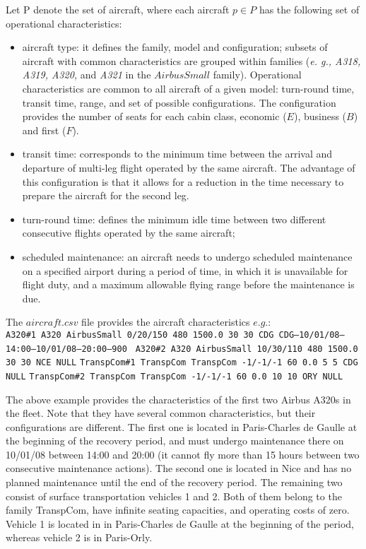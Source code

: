 \documentclass[ijoo,nonblindrev]{informs-ijoo}
\begin{document}
Let P denote the set of aircraft, where each aircraft $p \in  P$ has the following set of operational characteristics:\\
\begin{itemize}
	\item aircraft type: it defines the family, model and configuration; subsets of aircraft with common characteristics are grouped within families (\textit{e. g., A318, A319, A320,} and \textit{A321} in the \textit{$Airbus Small$} family). Operational characteristics are common to all aircraft of a given model: turn-round time, transit time, range, and set of possible configurations. The configuration provides the number of seats for each cabin class, economic ($E$), business ($B$) and first ($F$).
	
	\item transit time: corresponds to the minimum time between the arrival and departure of multi-leg flight operated by the same aircraft. The advantage of this configuration is that it allows for a reduction in the time necessary to prepare the aircraft for the second leg.
	
	\item turn-round time: defines the minimum idle time between two different consecutive flights operated by the same aircraft;
	\item scheduled maintenance: an aircraft needs to undergo scheduled maintenance on a specified airport during a period of time, in which it is unavailable for flight duty, and a maximum allowable flying range before the maintenance is due. 
\end{itemize}

The $aircraft.csv$ file provides the aircraft characteristics $e.g.$:\\
\newline
{\texttt{\footnotesize A320\#1 A320 AirbusSmall 0/20/150 480 1500.0 30 30 CDG CDG–10/01/08–14:00–10/01/08–20:00–900 }}
{\texttt{\footnotesize A320\#2 A320 AirbusSmall 10/30/110 480 1500.0 30 30 NCE NULL}}
\newline
{\texttt{\footnotesize TranspCom\#1 TranspCom TranspCom -1/-1/-1 60 0.0 5 5 CDG NULL}}
\newline
{\texttt{\footnotesize TranspCom\#2 TranspCom TranspCom -1/-1/-1 60 0.0 10 10 ORY NULL}}
\newline

The above example provides the characteristics of the first two Airbus A320s in the fleet. Note that they have several common characteristics, but their configurations are different. The first one is located in Paris-Charles de Gaulle at the beginning of the recovery period, and must undergo maintenance there on 10/01/08 between 14:00 and 20:00 (it cannot fly more than 15 hours between two consecutive maintenance actions). The second one is located in Nice and has no planned
maintenance until the end of the recovery period. The remaining two consist of surface transportation vehicles 1 and 2. Both of them belong to the family TranspCom, have infinite seating capacities, and operating costs of zero. Vehicle 1 is located in in Paris-Charles de Gaulle at the beginning of the period, whereas vehicle 2 is in Paris-Orly.
\end{document}
